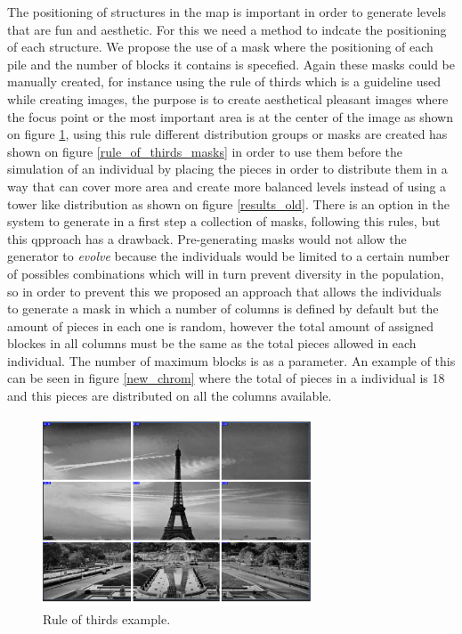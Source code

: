 \documentclass[conference]{IEEEtran}
\begin{document}
     The positioning of structures in the map is important in order to generate
     levels that are fun and aesthetic. For this we need a method to indcate the
     positioning of each structure. We propose the use of a mask where the
     positioning of each pile and the number of blocks it contains is specefied.
     Again these masks could be manually created, for instance using the rule of
     thirds \cite{DarrenRowse} which is a guideline used while creating images,
     the purpose is to create aesthetical pleasant images where the focus point
     or the most important area is at the center of the image as shown on figure
     \ref{rule_of_thirds}, using this rule different distribution groups or
     masks are created has shown on figure \ref{rule_of_thirds_masks} in order
     to use them before the simulation of an individual by placing the pieces in
     order to distribute them in a way that can cover more area and create more
     balanced levels instead of using a tower like distribution as shown on
     figure \ref{results_old}. There is an option in the system to generate in a
     first step a collection of masks, following this rules, but this qpproach
     has a drawback. Pre-generating masks would not allow the generator to
     \textit{evolve} because the individuals would be limited to a certain
     number of possibles combinations which will in turn prevent diversity in
     the population, so in order to prevent this we proposed an approach that
     allows the individuals to generate a mask in which a number of columns is
     defined by default but the amount of pieces in each one is random, however
     the total amount of assigned blockes in all columns must be the same as the
     total pieces allowed in each individual. The number of maximum blocks is as
     a parameter. An example of this can be seen in figure \ref{new_chrom} where
     the total of pieces in a individual is 18 and this pieces are distributed
     on all the columns available.
     
    
    \begin{figure}[htbp]
        \centerline{\includegraphics[width=80mm]{Images/ruleofthirds_example.png}}
        \caption{Rule of thirds example.}
        \label{rule_of_thirds}
    \end{figure}
    
\end{document}
